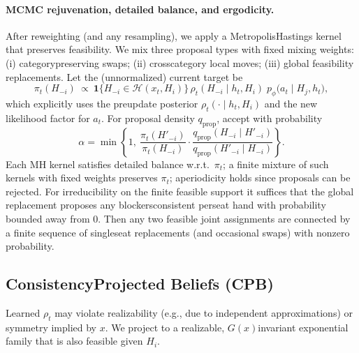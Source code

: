\documentclass[10pt]{article}
\newcommand{\1}{\mathbf{1}}
\theoremstyle{plain}
\begin{document}
\paragraph{MCMC rejuvenation, detailed balance, and ergodicity.}
After reweighting (and any resampling), we apply a Metropolis\textendash Hastings kernel that preserves feasibility. We mix three proposal types with fixed mixing weights: (i) category\textendash preserving swaps; (ii) cross\textendash category local moves; (iii) global feasibility replacements. Let the (unnormalized) current target be
\[
\pi_t(H_{-i})\ \propto\ \1\{H_{-i}\in \mathcal{H}(x_t,H_i)\}\,\rho_t(H_{-i}\mid h_t,H_i)\; p_\phi\!\big(a_t \mid H_j, h_t\big),
\]
which explicitly uses the pre\textendash update posterior $\rho_t(\cdot\mid h_t,H_i)$ and the new likelihood factor for $a_t$. For proposal density $q_{\text{prop}}$, accept with probability
\[
\alpha=\min\!\left\{1,\ \frac{\pi_t(H'_{-i})}{\pi_t(H_{-i})} \cdot \frac{q_{\text{prop}}(H_{-i}\mid H'_{-i})}{q_{\text{prop}}(H'_{-i}\mid H_{-i})}\right\}.
\]
Each MH kernel satisfies detailed balance w.r.t.\ $\pi_t$; a finite mixture of such kernels with fixed weights preserves $\pi_t$; aperiodicity holds since proposals can be rejected. For irreducibility on the finite feasible support it suffices that the global replacement proposes any blockers\textendash consistent per\textendash seat hand with probability bounded away from $0$. Then any two feasible joint assignments are connected by a finite sequence of single\textendash seat replacements (and occasional swaps) with nonzero probability.

\subsection{Consistency\textendash Projected Beliefs (CPB)}
\label{sec:cpb}
Learned $\rho_t$ may violate realizability (e.g., due to independent approximations) or symmetry implied by $x$. We project to a realizable, $G(x)$\textendash invariant exponential family that is also feasible given $H_i$.
\end{document}
